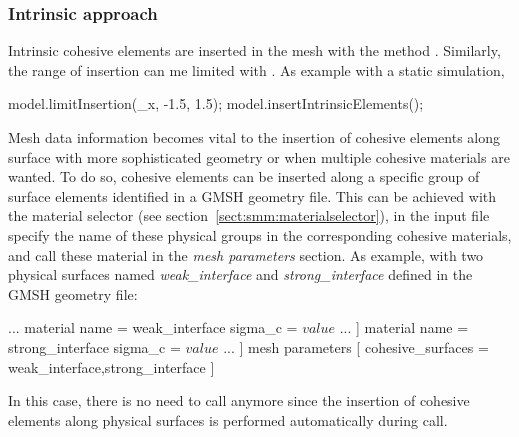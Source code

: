 \subsubsection{Intrinsic approach \label{intrinsic_insertion}}
Intrinsic cohesive elements are inserted in the mesh with the method 
. Similarly, the range of insertion can me limited 
with . As example with a static simulation,
\begin{cpp}
  model.limitInsertion(_x, -1.5, 1.5);
  model.insertIntrinsicElements();
\end{cpp} 
Mesh data information becomes vital to the insertion of cohesive elements along 
surface with more sophisticated geometry or when multiple cohesive materials are 
wanted. To do so, cohesive elements can be inserted along a 
specific group of surface elements identified in a GMSH geometry file. This can 
be achieved with the material selector (see section~\ref{sect:smm:materialselector}), in the input file specify the name of these physical groups in the corresponding cohesive materials, and call these material in the \textit{mesh parameters} section. As example, with two physical surfaces named 
\textit{weak\_interface} and \textit{strong\_interface} defined in the GMSH 
geometry file:
\begin{cpp}
...
  material %
     name = weak_interface
     sigma_c = $value$
     ...
  ]
  material %
     name = strong_interface
     sigma_c = $value$
     ...
  ]
  mesh parameters [
     	cohesive_surfaces = weak_interface,strong_interface
  ]
\end{cpp}

In this case, there is no need to call  anymore 
since the insertion of cohesive elements along physical surfaces is performed 
automatically during  call.    
